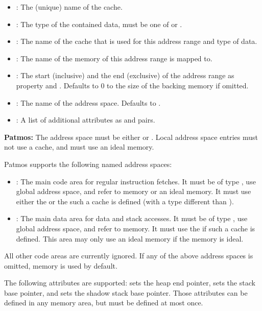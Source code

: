 \begin{itemize}
  \begin{itemize}
  \item {}: The (unique) name of the cache.
  \item {}: The type of the contained data, must be one of  or .
  \item {}: The name of the cache that is used for this address range and type of data.
  \item {}: The name of the memory of this address range is mapped to.
  \item {}: The start (inclusive) and the end (exclusive) of the address range as property  and .
    Defaults to $0$ to the size of the backing memory if omitted.
  \item {}: The name of the address space. Defaults to .
  \item {}: A list of additional attributes as  and  pairs.
  \end{itemize}
  
  \begin{framed}
  \textbf{Patmos:} The address space must be either  or . Local address space entries must not
  use a cache, and must use an ideal memory.

  Patmos supports the following named address spaces: 
  
  \begin{itemize}
  \item {}: The main code area for regular instruction fetches. It must be of type , use global address space, and refer to
                      memory or an ideal memory. It must use either the  or the  such
		     a cache is defined (with a type different than ).
  \item {}: The main data area for data and stack accesses. It must be of type , use global address space, and refer to
                      memory. It must use the  if such a cache is defined. This area may
		     only use an ideal memory if the  memory is ideal.
  \end{itemize}

  All other code areas are currently ignored. If any of the above address spaces is omitted,  memory is used
  by default.


  The following attributes are supported:  sets the heap end pointer,  sets the stack
  base pointer, and  sets the shadow stack base pointer. Those attributes can be defined in
  any memory area, but must be defined at most once.
  \end{framed}

\end{itemize}


